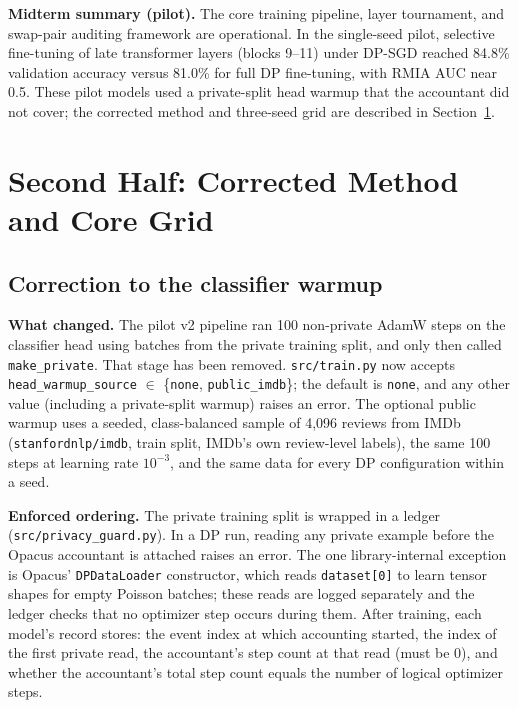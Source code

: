 \documentclass[11pt,a4paper]{article}
\begin{document}
\bigskip
\textbf{Midterm summary (pilot).}
The core training pipeline, layer tournament, and swap-pair auditing framework are operational.
In the single-seed pilot, selective fine-tuning of late transformer layers (blocks 9--11) under
DP-SGD reached 84.8\% validation accuracy versus 81.0\% for full DP fine-tuning, with RMIA AUC
near 0.5. These pilot models used a private-split head warmup that the accountant did not cover;
the corrected method and three-seed grid are described in Section~\ref{sec:corrected}.

\section{Second Half: Corrected Method and Core Grid}\label{sec:corrected}

\subsection{Correction to the classifier warmup}

\textbf{What changed.} The pilot v2 pipeline ran 100 non-private AdamW steps on the classifier head
using batches from the private training split, and only then called \texttt{make\_private}. That
stage has been removed. \texttt{src/train.py} now accepts \texttt{head\_warmup\_source} $\in$
\{\texttt{none}, \texttt{public\_imdb}\}; the default is \texttt{none}, and any other value (including a
private-split warmup) raises an error. The optional public warmup uses a seeded, class-balanced sample of
4{,}096 reviews from IMDb (\texttt{stanfordnlp/imdb}, train split, IMDb's own review-level labels), the
same 100 steps at learning rate $10^{-3}$, and the same data for every DP configuration within a seed.

\textbf{Enforced ordering.} The private training split is wrapped in a ledger
(\texttt{src/privacy\_guard.py}). In a DP run, reading any private example before the Opacus
accountant is attached raises an error. The one library-internal exception is Opacus'
\texttt{DPDataLoader} constructor, which reads \texttt{dataset[0]} to learn tensor shapes for empty Poisson
batches; these reads are logged separately and the ledger checks that no optimizer step occurs during them.
After training, each model's record stores: the event index at which accounting started, the index of the
first private read, the accountant's step count at that read (must be 0), and whether the accountant's
total step count equals the number of logical optimizer steps.
\end{document}
